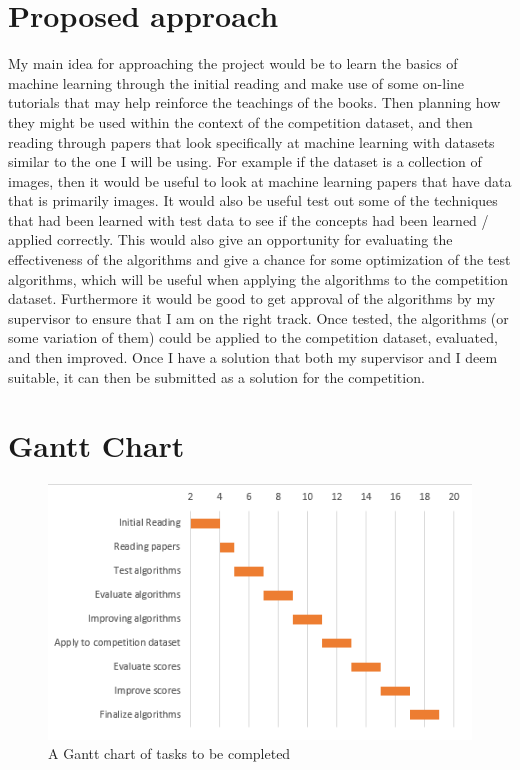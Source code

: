 \documentclass[proposal]{cmpreport}
\begin{document}
\section{Proposed approach}
My main idea for approaching the project would be to learn the basics of machine learning through the initial reading and make use of some on-line tutorials that may help reinforce the teachings of the books. Then planning how they might be used within the context of the competition dataset, and then reading through papers that look specifically at machine learning with datasets similar to the one I will be using. For example if the dataset is a collection of images, then it would be useful to look at machine learning papers that have data that is primarily images.
It would also be useful test out some of the techniques that had been learned with test data to see if the concepts had been learned / applied correctly. This would also give an opportunity for evaluating the effectiveness of the algorithms and give a chance for some optimization of the test algorithms, which will be useful when applying the algorithms to the competition dataset. Furthermore it would be good to get approval of the algorithms by my supervisor to ensure that I am on the right track.
Once tested, the algorithms (or some variation of them) could be applied to the competition dataset, evaluated, and then improved. Once I have a solution that both my supervisor and I deem suitable, it can then be submitted as a solution for the competition.

\section{Gantt Chart}
\begin{figure}[!htb]
\includegraphics[]{project-gantt-chart.png}
\caption{A Gantt chart of tasks to be completed}
\end{figure}
\end{document}
